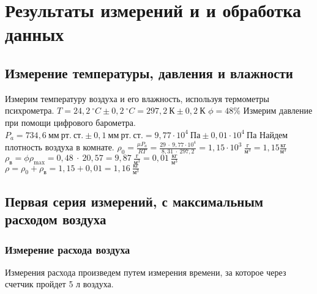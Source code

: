 \documentclass[a4paper,11pt]{article}
\begin{document}
\section{Результаты измерений и и обработка данных}
\subsection{Измерение температуры, давления и влажности}
Измерим температуру воздуха и его влажность, используя термометры психрометра.\newline\newline
$T = 24,2\ ^{\circ} C \pm 0,2\ ^{\circ} C = 297,2\ К \pm 0,2\ К$\newline\newline
$\phi = 48\%$\newline\newline
Измерим давление при помощи цифрового барометра.\newline\newline
$P_{a} = 734,6\ мм\ рт.\ ст. \pm 0,1\ мм\ рт.\ ст. = 9,77 \cdot 10^{4}\ Па \pm 0,01 \cdot 10^{4}\ Па$\newline\newline
Найдем плотность воздуха в комнате.\newline\newline
$\rho_{0} = \frac{\mu P_{a}}{RT} = \frac{29\ \cdot\ 9,77 \cdot 10^{4}}{8,31\ \cdot\ 297,2} = 1,15 \cdot 10^{3}\ \frac{г}{м^{3}} = 1,15 \frac{кг}{м^{3}}$\newline\newline
$\ $
$\rho_{в} = \phi \rho_{\max} = 0,48\ \cdot\ 20,57 = 9,87\ \frac{г}{м^{3}} = 0,01\ \frac{кг}{м^{3}}$\newline\newline
$\rho = \rho_{0} + \rho_{в} = 1,15 + 0,01 = 1,16\ \frac{кг}{м^{3}}$\newline\newline
\subsection{Первая серия измерений, с максимальным расходом воздуха}
\subsubsection{Измерение расхода воздуха}
Измерения расхода произведем путем измерения времени, за которое через счетчик пройдет 5 л воздуха.\newline
\end{document}
